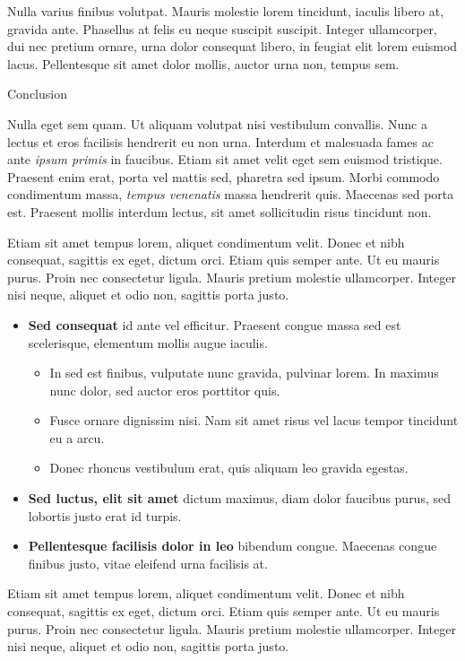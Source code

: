 \documentclass[final]{beamer}
\newlength{\colwidth}
\begin{document}
\begin{frame}[t]
\begin{columns}[t]
\begin{column}{\colwidth}
\begin{block}{}
    Nulla varius finibus volutpat. Mauris molestie lorem tincidunt, iaculis
    libero at, gravida ante. Phasellus at felis eu neque suscipit suscipit.
    Integer ullamcorper, dui nec pretium ornare, urna dolor consequat libero,
    in feugiat elit lorem euismod lacus. Pellentesque sit amet dolor mollis,
    auctor urna non, tempus sem.

  \end{block}
  
\begin{block}{Conclusion}

    Nulla eget sem quam. Ut aliquam volutpat nisi vestibulum convallis. Nunc a
    lectus et eros facilisis hendrerit eu non urna. Interdum et malesuada fames
    ac ante \textit{ipsum primis} in faucibus. Etiam sit amet velit eget sem
    euismod tristique. Praesent enim erat, porta vel mattis sed, pharetra sed
    ipsum. Morbi commodo condimentum massa, \textit{tempus venenatis} massa
    hendrerit quis. Maecenas sed porta est. Praesent mollis interdum lectus,
    sit amet sollicitudin risus tincidunt non.

    Etiam sit amet tempus lorem, aliquet condimentum velit. Donec et nibh
    consequat, sagittis ex eget, dictum orci. Etiam quis semper ante. Ut eu
    mauris purus. Proin nec consectetur ligula. Mauris pretium molestie
    ullamcorper. Integer nisi neque, aliquet et odio non, sagittis porta justo.

    \begin{itemize}
      \item \textbf{Sed consequat} id ante vel efficitur. Praesent congue massa
        sed est scelerisque, elementum mollis augue iaculis.
        \begin{itemize}
          \item In sed est finibus, vulputate
            nunc gravida, pulvinar lorem. In maximus nunc dolor, sed auctor eros
            porttitor quis.
          \item Fusce ornare dignissim nisi. Nam sit amet risus vel lacus
            tempor tincidunt eu a arcu.
          \item Donec rhoncus vestibulum erat, quis aliquam leo
            gravida egestas.
        \end{itemize}
      \item \textbf{Sed luctus, elit sit amet} dictum maximus, diam dolor
        faucibus purus, sed lobortis justo erat id turpis.
      \item \textbf{Pellentesque facilisis dolor in leo} bibendum congue.
        Maecenas congue finibus justo, vitae eleifend urna facilisis at.
    \end{itemize}
    Etiam sit amet tempus lorem, aliquet condimentum velit. Donec et nibh
    consequat, sagittis ex eget, dictum orci. Etiam quis semper ante. Ut eu
    mauris purus. Proin nec consectetur ligula. Mauris pretium molestie
    ullamcorper. Integer nisi neque, aliquet et odio non, sagittis porta justo.


\end{block}
\end{column}
\end{columns}
\end{frame}
\end{document}
